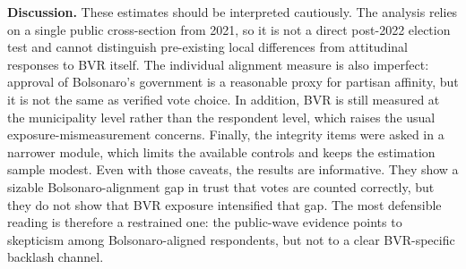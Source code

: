 \textbf{Discussion.} These estimates should be interpreted cautiously. The analysis relies on a single public cross-section from 2021, so it is not a direct post-2022 election test and cannot distinguish pre-existing local differences from attitudinal responses to BVR itself. The individual alignment measure is also imperfect: approval of Bolsonaro's government is a reasonable proxy for partisan affinity, but it is not the same as verified vote choice. In addition, BVR is still measured at the municipality level rather than the respondent level, which raises the usual exposure-mismeasurement concerns. Finally, the integrity items were asked in a narrower module, which limits the available controls and keeps the estimation sample modest. Even with those caveats, the results are informative. They show a sizable Bolsonaro-alignment gap in trust that votes are counted correctly, but they do not show that BVR exposure intensified that gap. The most defensible reading is therefore a restrained one: the public-wave evidence points to skepticism among Bolsonaro-aligned respondents, but not to a clear BVR-specific backlash channel.
